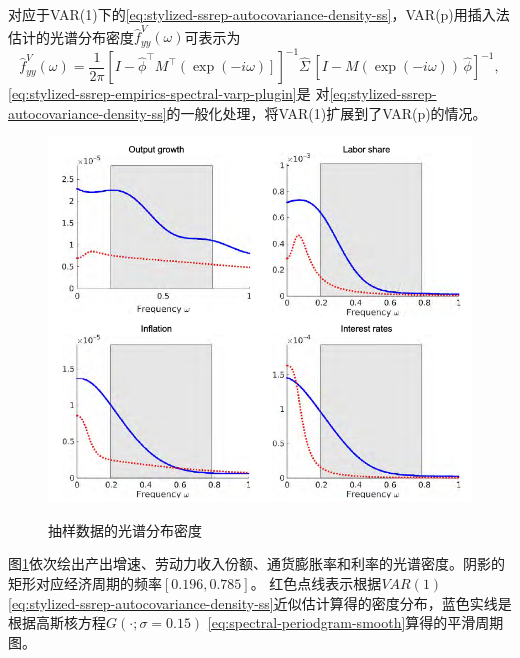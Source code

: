 对应于VAR(1)下的\eqref{eq:stylized-ssrep-autocovariance-density-ss}，VAR(p)用插入法估计的光谱分布密度$\hat{f}_{yy}^{V} \left( \omega \right)$可表示为
\begin{equation}
  \label{eq:stylized-ssrep-empirics-spectral-varp-plugin}
  \hat{f}_{yy}^{V} \left( \omega \right)
  = \frac{1}{2 \pi}
  \left[
  I - \hat{\phi}^{\top} M^{\top} \left( \exp \left( - i \omega \right) \right]
  \right]^{-1}  \hat{\Sigma} \,
  \left[
  I - M \left( \exp \left( - i \omega \right)  \right) \,\hat{\phi}
  \right]^{-1},
\end{equation}
\eqref{eq:stylized-ssrep-empirics-spectral-varp-plugin}是
对\eqref{eq:stylized-ssrep-autocovariance-density-ss}的一般化处理，将VAR(1)扩展到了VAR(p)的情况。

\begin{figure}[htbp]
  \caption{抽样数据的光谱分布密度}
  \centering
  \includegraphics[width=12cm]{./Figures/20180406-empirics-spectrum}
  \label{fig:stylized-ssrep-empirics-spectrum}
%
\end{figure}

图\ref{fig:stylized-ssrep-empirics-spectrum}依次绘出产出增速、劳动力收入份额、通货膨胀率和利率的光谱密度。阴影的矩形对应经济周期的频率$\left[ 0.196,0.785 \right]$。
红色点线表示根据$VAR(1)$ \eqref{eq:stylized-ssrep-autocovariance-density-ss}近似估计算得的密度分布，蓝色实线是根据高斯核方程$G \left(\cdot ; \sigma=0.15 \right)$ \eqref{eq:spectral-periodgram-smooth}算得的平滑周期图。

